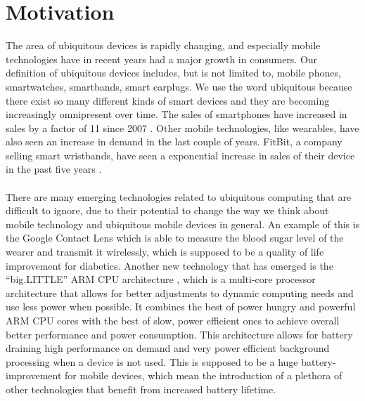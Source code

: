 
\section{Motivation}
\label{sec:motivation}

The area of ubiquitous devices is rapidly changing, and especially mobile technologies have in recent years had a major growth in consumers. Our definition of ubiquitous devices includes, but is not limited to, mobile phones, smartwatches, smartbands, smart earplugs. We use the word ubiquitous because there exist so many different kinds of smart devices and they are becoming increasingly omnipresent over time. The sales of smartphones have increased in sales by a factor of 11 since 2007 \parencite{statsia_smartphones}. Other mobile technologies, like wearables, have also seen an increase in demand in the last couple of years. FitBit, a company selling smart wristbands, have seen a exponential increase in sales of their device in the past five years \parencite{statsia_fitbit}.  
\\\\
There are many emerging technologies related to ubiquitous computing that are difficult to ignore, due to their potential to change the way we think about mobile technology and ubiquitous mobile devices in general. An example of this is the Google Contact Lens \parencite{google_contact_lens} which is able to measure the blood sugar level of the wearer and transmit it wirelessly, which is supposed to be a quality of life improvement for diabetics. Another new technology that has emerged is the ``big.LITTLE'' ARM CPU architecture \parencite{big_little_architecture}, which is a multi-core processor architecture that allows for better adjustments to dynamic computing needs and use less power when possible. It combines the best of power hungry and powerful ARM CPU cores with the best of slow, power efficient ones to achieve overall better performance and power consumption. This architecture allows for battery draining high performance on demand and very power efficient background processing when a device is not used. This is supposed to be a huge battery-improvement for mobile devices, which mean the introduction of a plethora of other technologies that benefit from increased battery lifetime. 
